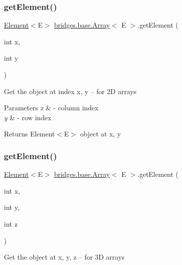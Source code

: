 \subsubsection{\texorpdfstring{getElement()}{getElement()}\hspace{0.1cm}{\footnotesize\ttfamily [2/3]}}
{\footnotesize\ttfamily \mbox{\hyperlink{classbridges_1_1base_1_1_element}{Element}}$<$E$>$ \mbox{\hyperlink{classbridges_1_1base_1_1_array}{bridges.\+base.\+Array}}$<$ E $>$.get\+Element (\begin{DoxyParamCaption}\item[{int}]{x,  }\item[{int}]{y }\end{DoxyParamCaption})}

Get the object at index x, y -- for 2D arrays


\begin{DoxyParams}{Parameters}
{\em x} & -\/ column index \\
\hline
{\em y} & -\/ row index \\
\hline
\end{DoxyParams}
\begin{DoxyReturn}{Returns}
Element$<$\+E$>$ object at x, y 
\end{DoxyReturn}
\mbox{\label{classbridges_1_1base_1_1_array_a09b5bd2d3b4cd12aea34b5e62b5e801a}} 
\subsubsection{\texorpdfstring{getElement()}{getElement()}\hspace{0.1cm}{\footnotesize\ttfamily [3/3]}}
{\footnotesize\ttfamily \mbox{\hyperlink{classbridges_1_1base_1_1_element}{Element}}$<$E$>$ \mbox{\hyperlink{classbridges_1_1base_1_1_array}{bridges.\+base.\+Array}}$<$ E $>$.get\+Element (\begin{DoxyParamCaption}\item[{int}]{x,  }\item[{int}]{y,  }\item[{int}]{z }\end{DoxyParamCaption})}

Get the object at x, y, z -- for 3D arrays


